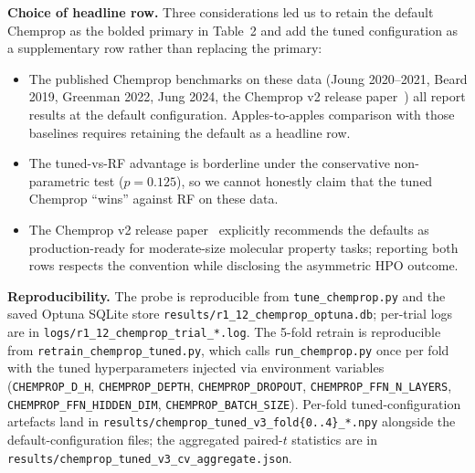 \documentclass[11pt]{article}
\begin{document}
{\textbf{Choice of headline row.} Three considerations led us to retain the default Chemprop as the bolded primary in Table~2 and add the tuned configuration as a supplementary row rather than replacing the primary:
\begin{itemize}[leftmargin=2em,itemsep=2pt]
  \item The published Chemprop benchmarks on these data (Joung 2020--2021, Beard 2019, Greenman 2022, Jung 2024, the Chemprop v2 release paper~\cite{chempropv2_2024}) all report results at the default configuration. Apples-to-apples comparison with those baselines requires retaining the default as a headline row.
  \item The tuned-vs-RF advantage is borderline under the conservative non-parametric test ($p = 0.125$), so we cannot honestly claim that the tuned Chemprop ``wins'' against RF on these data.
  \item The Chemprop v2 release paper~\cite{chempropv2_2024} explicitly recommends the defaults as production-ready for moderate-size molecular property tasks; reporting both rows respects the convention while disclosing the asymmetric HPO outcome.
\end{itemize}

\textbf{Reproducibility.} The probe is reproducible from \texttt{tune\_chemprop.py} and the saved Optuna SQLite store \texttt{results/r1\_12\_chemprop\_optuna.db}; per-trial logs are in \texttt{logs/r1\_12\_chemprop\_trial\_*.log}. The 5-fold retrain is reproducible from \texttt{retrain\_chemprop\_tuned.py}, which calls \texttt{run\_chemprop.py} once per fold with the tuned hyperparameters injected via environment variables (\texttt{CHEMPROP\_D\_H}, \texttt{CHEMPROP\_DEPTH}, \texttt{CHEMPROP\_DROPOUT}, \texttt{CHEMPROP\_FFN\_N\_LAYERS}, \texttt{CHEMPROP\_FFN\_HIDDEN\_DIM}, \texttt{CHEMPROP\_BATCH\_SIZE}). Per-fold tuned-configuration artefacts land in \texttt{results/chemprop\_tuned\_v3\_fold\{0..4\}\_*.npy} alongside the default-configuration files; the aggregated paired-$t$ statistics are in \texttt{results/chemprop\_tuned\_v3\_cv\_aggregate.json}.}
\end{document}
